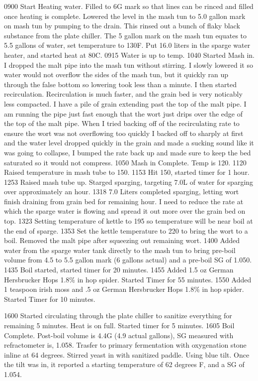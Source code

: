 0900 Start Heating water.  Filled to 6G mark so that lines can be rinced and filled once heating is complete. Lowered the level in the mash tun to 5.0 gallon mark on mash tun by pumping to the drain.  This rinsed out a bunch of flaky black substance from the plate chiller.  The 5 gallon mark on the mash tun equates to 5.5 gallons of water, set temperature to 130F.  Put 16.0 liters in the sparge water heater, and started heat at 80C.  
0915 Water is up to temp.
1040 Started Mash in.  I dropped the malt pipe into the mash tun without stirring.  I slowly lowered it so water would not overflow the sides of the mash tun, but it quickly ran up through the false bottom so lowering took less than a minute.  I then started recirculation.  Recirculation is much faster, and the grain bed is very noticably less compacted.  I have a pile of grain extending past the top of the malt pipe.  I am running the pipe just fast enough that the wort just drips over the edge of the top of the malt pipe.  When I tried backing off of the recirculating rate to ensure the wort was not overflowing too quickly I backed off to sharply at first and the water level dropped quickly in the grain and made a sucking sound like it was going to collapse, I bumped the rate back up and made sure to keep the bed saturated so it would not compress.
1050 Mash in Complete. Temp is 120.
1120 Raised temperature in mash tube to 150.
1153 Hit 150, started timer for 1 hour.
1253 Raised mash tube up. Starged sparging, targeting 7.0L of water for sparging over approximately an hour.  
1318 7.0 Liters completed sparging, letting wort finish draining from grain bed for remaining hour.  I need to reduce the rate at which the sparge water is flowing and spread it out more over the grain bed on top.
1323 Setting temperature of kettle to 195 so temperature will be near boil at the end of sparge.
1353 Set the kettle temperature to 220 to bring the wort to a boil.  Removed the malt pipe after squeezing out remaining wort.
1400 Added water from the sparge water tank directly to the mash tun to bring pre-boil volume from 4.5 to 5.5 gallon mark (6 gallons actual) and a pre-boil SG of 1.050.
1435 Boil started, started timer for 20 minutes.
1455 Added 1.5 oz German Hersbrucker Hops 1.8\% in hop spider.  Started Timer for 55 minutes.
1550 Added 1 teaspoon irish moss and .5 oz  German Hersbrucker Hops 1.8\% in hop spider. Started Timer for 10 minutes.

1600 Started circulating through the plate chiller to sanitize everything for remaining 5 minutes.  Heat is on full. Started timer for 5 minutes.
1605 Boil Complete.  Post-boil volume is 4.4G (4.9 actual gallons), SG measured with refractometer is, 1.058. Trasfer to primary fermentation with oxygenation stone inline at 64 degrees.  Stirred yeast in with sanitized paddle. Using blue tilt. Once the tilt was in, it reported a starting temperature of 62 degrees F, and a SG of 1.054.


